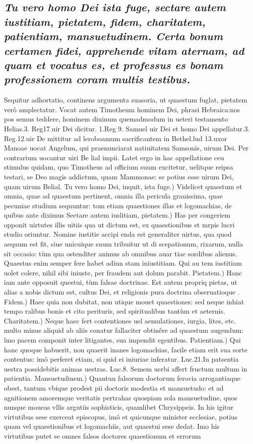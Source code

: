 \documentclass{article}
\begin{document}
\begin{pages}
\subsection*{\textit{Tu vero homo Dei ista fuge, sectare autem iustitiam, pietatem, fidem, charitatem, patientiam, mansuetudinem. Certa bonum certamen fidei, apprehende vitam aternam, ad quam et vocatus es, et professus es bonam professionem coram multis testibus. }}\pstart Sequitur adhortatio, continens argumenta suasoria, ut quaestum fuglat, pietatem verô amplectatur. Vocat autem Timotheum hominem Dei, phrasi Hebraica:nos pos semus teddere, hominem diuinum quemadmodum in ueteri testamento Helias.3. Reg17.uir Dei dicitur. 1.Reg 9. Samuel uir Dei et homo Dei appellatur.3. Reg.12.uir De mittitur ad leroboamum sacrificantem in Bethel.lud 13.uxor Manoae uocat Angelum, qui praenunciarat natiuitatem Samsonis, uirum Dei. Per contrarium uocantur uiri Be lial impii. Latet ergo in hac appellatione ceu stimulus quidam, quo Timotheus ad officium suum excitetur, uelitque reipsa testari, se Deo magis addictum, quam Mammonae: se potius esse uirum Dei, quam uirum Belial.  \pend\pstart Tu vero homo Dei, inquit, ista fuge.) Videlicet quaestum et omnia, quae ad quaestum pertinent, omnia illa pericula grauissima, quae pecuniae studium sequuntur: tom etiam quaestiones illas et logomachias, de quibus ante diximus  \pend\pstart Sectare autem iuslitiam, pietatem.) Has per congeriem opponit uirtutes illis uitiis qua ut dictum est, ex quaestionibus et mrpis lucri studio oriuntur. Nomine iustitie accipi enda est generaliter uirtus, qua quod aequum est fit, siue unicuique suum tribuitur ut di scepationum, rixarum, nulla sit occasio: tùm qua ostenditer animus ab omnibus auar tiae sordibus alienus. Quaestus enim semper fere habet adiun stam iniustitiam. Qui au tem iustitiam uolet colere, nihil sibi iniuste, per fraudem aut dolum parabit.  \pend\pstart Pietatem.) Hanc iam ante opposuit questui, tùm falsae doctrinae. Est autem propriq pietas, ut alias a nobis dictum est, cultus Dei, et religionis pura doctrina obseruatioque . Fidem.) Haec quia non dubitat, non utique mouet quaestiones: sed neque inhiat tempo ralibus bonis et cito perituris, sed spiritualibus tantùm et aeternis.  \pend\pstart Charitatem.) Neque haec fert contentiones uel aemulationes, iurgia, lites, etc. multo minus aliquid ab aliis conatur fallaciter obtinêre ad quaestum augendum: lmo pacem componit inter litigantes, sua impendit egentibus.  \pend\pstart Patientiam.) Qui hanc quoque habuerit, non quaerit inanes logomachias, facile etiam erit sua sorte contentus: imô perferet etiam, si quid ei iniuriae inferatur. Luc.21.In patsentia uestra possidebitis animas uestras. Luc.8. Semem uerbi affert fructum multum in patientia. Mansuetudinem.) Quantun falsorum doctorum ferocia arrogantiaque obest, tantum vbique prodest pii doctoris modestia et mansuetudo: et ad agnitionem amoremque veritatis pertrahas quospiam sola mansuetudine, quos nunque moueas vllis argutiis sophisticis, quamlibet Chrysippeis. In his igitur virtutibus sese exerceat episcopus, imô et quicunque minister ecclesiae, potius quam vel quaestionibus et logomachiis, aut quaestui sese dedat. Imo his virtutibus putet se omnes falsos doctores quaestionum et errorum 
\end{pages}
\end{document}
